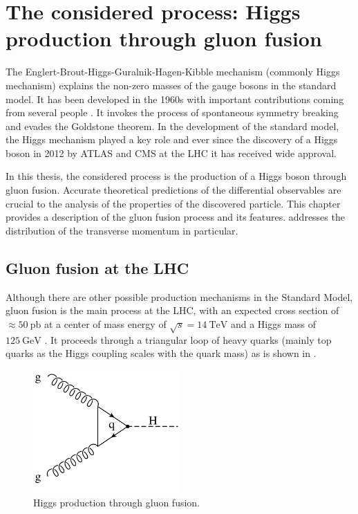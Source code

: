 
\chapter{The considered process: Higgs production through gluon fusion}
\label{ch:gfusion}
The Englert-Brout-Higgs-Guralnik-Hagen-Kibble mechanism (commonly Higgs mechanism) explains the non-zero masses of the gauge bosons in the standard model.
It has been developed in the 1960s with important contributions coming from several people \cite{higgs1964a,higgs1964b,englert1964,guralnik1964,nambu1960,anderson1963}.
It invokes the process of spontaneous symmetry breaking and evades the Goldstone theorem.
In the development of the standard model, the Higgs mechanism played a key role and ever since the discovery of a Higgs boson in 2012 by ATLAS \cite{higgsdiscovery_atlas2012} and CMS \cite{higgsdiscovery_cms2012} at the LHC it has received wide approval.

In this thesis, the considered process is the production of a Higgs boson through gluon fusion.
Accurate theoretical predictions of the differential observables are crucial to the analysis of the properties of the discovered particle.
This chapter provides a description of the gluon fusion process and its features.
 addresses the distribution of the transverse momentum in particular.
%
\section{Gluon fusion at the LHC}
Although there are other possible production mechanisms in the Standard Model, gluon fusion is the main process at the LHC, with an expected cross section of $\approx \SI{50}{\pico\barn}$ at a center of mass energy of $\sqrt{s} = \SI{14}{\tera\electronvolt}$ and a Higgs mass of $\SI{125}{\giga\electronvolt}$ \cite{higgshandbook1}.
It proceeds through a triangular loop of heavy quarks (mainly top quarks as the Higgs coupling scales with the quark mass) as is shown in .
%
\begin{figure}[]
	\includegraphics[width=0.5\textwidth]{images/gluonfusion.pdf}
	\caption{Higgs production through gluon fusion.}
	\label{fig:gluonfusion}
\end{figure}
%

